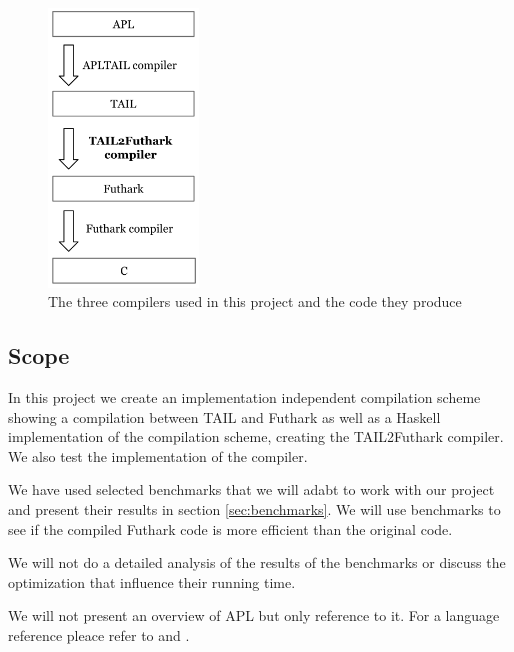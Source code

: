 \documentclass[11pt]{article}
\begin{document}
\begin{figure}
\begin{center}
    \includegraphics[width=4cm]{compilers.png}
    \caption{The three compilers used in this project and the code they produce }
    \label{fig:compilers}
\end{center}
\end{figure}


\subsection{Scope}
In this project we create an implementation independent compilation scheme showing a compilation between TAIL and Futhark as well as a Haskell implementation of the compilation scheme, creating the TAIL2Futhark compiler. We also test the implementation of the compiler. 

We have used selected benchmarks that we will adabt to work with our project and present their results in section \ref{sec:benchmarks}. We will use benchmarks to see if the compiled Futhark code is more efficient than the original code. 

We will not do a detailed analysis of the results of the benchmarks or discuss the optimization that influence their running time.

We will not present an overview of APL but only reference to it. For a language reference pleace refer to \cite{APLbook} and \cite{APLDyalog}.
\end{document}
